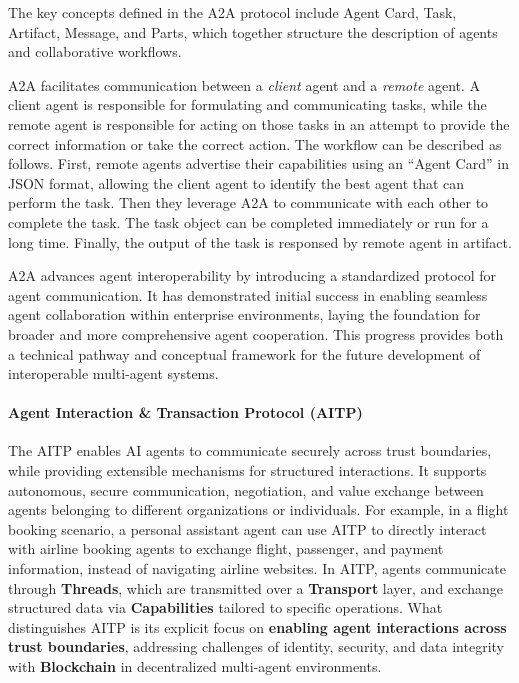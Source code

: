 \documentclass[10pt,preprint]{article}
\begin{document}
The key concepts defined in the A2A protocol include Agent Card, Task, Artifact, Message, and Parts, which together structure the description of agents and collaborative workflows.


A2A facilitates communication between a \textit{client} agent and a \textit{remote} agent. A client agent is responsible for formulating and communicating tasks, while the remote agent is responsible for acting on those tasks in an attempt to provide the correct information or take the correct action. The workflow can be described as follows. First, remote agents advertise their capabilities using an “Agent Card” in JSON format, allowing the client agent to identify the best agent that can perform the task. Then they leverage A2A to communicate with each other to complete the task. The task object can be completed immediately or run for a long time. Finally, the output of the task is responsed by remote agent in artifact.

A2A advances agent interoperability by introducing a standardized protocol for agent communication. It has demonstrated initial success in enabling seamless agent collaboration within enterprise environments, laying the foundation for broader and more comprehensive agent cooperation. This progress provides both a technical pathway and conceptual framework for the future development of interoperable multi-agent systems.

\paragraph{Agent Interaction \& Transaction Protocol (AITP)~\citep{aitp}} 
The AITP enables AI agents to communicate securely across trust boundaries, while providing extensible mechanisms for structured interactions. It supports autonomous, secure communication, negotiation, and value exchange between agents belonging to different organizations or individuals. For example, in a flight booking scenario, a personal assistant agent can use AITP to directly interact with airline booking agents to exchange flight, passenger, and payment information, instead of navigating airline websites. In AITP, agents communicate through \textbf{Threads}, which are transmitted over a \textbf{Transport} layer, and exchange structured data via \textbf{Capabilities} tailored to specific operations. What distinguishes AITP is its explicit focus on \textbf{enabling agent interactions across trust boundaries}, addressing challenges of identity, security, and data integrity with \textbf{Blockchain} in decentralized multi-agent environments.
\end{document}
